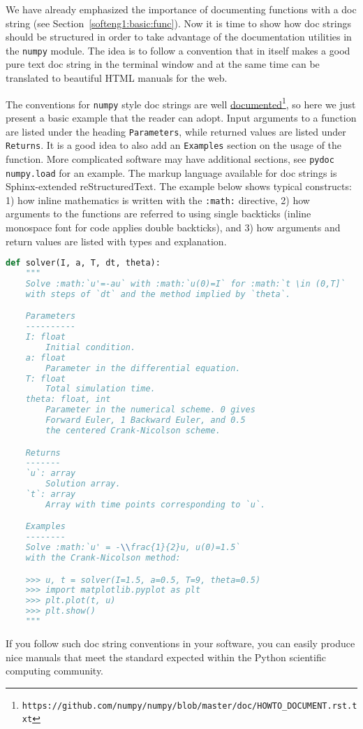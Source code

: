 \documentclass[graybox,sectrefs,envcountresetchap,open=right,final]{svmonodo}
\begin{document}
We have already emphasized the importance of documenting functions with
a doc string (see Section~\ref{softeng1:basic:func}). Now it is time
to show how doc strings should be structured in order to take advantage
of the documentation utilities in the \texttt{numpy} module. The idea is
to follow a convention that in itself makes a good pure text doc string
in the terminal window
and at the same time can be translated to beautiful HTML manuals for
the web.

The conventions for \texttt{numpy} style doc strings are well
\href{{https://github.com/numpy/numpy/blob/master/doc/HOWTO_DOCUMENT.rst.txt}}{documented}\footnote{\texttt{https://github.com/numpy/numpy/blob/master/doc/HOWTO\_DOCUMENT.rst.txt}}, so here we just present a basic example that the reader can adopt.
Input arguments to a function are listed under the heading \texttt{Parameters},
while returned values are listed under \texttt{Returns}. It is a good idea to
also add an \texttt{Examples} section on the usage of the function.
More complicated software may have additional sections, see \texttt{pydoc numpy.load}
for an example. The markup language available for doc strings is
Sphinx-extended reStructuredText. The example below shows typical
constructs: 1) how inline
mathematics is written with the \texttt{:math:} directive, 2) how arguments
to the functions are referred to using single backticks
(inline monospace font for code applies double backticks), and 3) how
arguments and return values are listed with types and explanation.

\begin{lstlisting}[language=Python,style=blue1_bluegreen]
def solver(I, a, T, dt, theta):
    """
    Solve :math:`u'=-au` with :math:`u(0)=I` for :math:`t \in (0,T]`
    with steps of `dt` and the method implied by `theta`.

    Parameters
    ----------
    I: float
        Initial condition.
    a: float
        Parameter in the differential equation.
    T: float
        Total simulation time.
    theta: float, int
        Parameter in the numerical scheme. 0 gives
        Forward Euler, 1 Backward Euler, and 0.5
        the centered Crank-Nicolson scheme.

    Returns
    -------
    `u`: array
        Solution array.
    `t`: array
        Array with time points corresponding to `u`.

    Examples
    --------
    Solve :math:`u' = -\\frac{1}{2}u, u(0)=1.5`
    with the Crank-Nicolson method:

    >>> u, t = solver(I=1.5, a=0.5, T=9, theta=0.5)
    >>> import matplotlib.pyplot as plt
    >>> plt.plot(t, u)
    >>> plt.show()
    """
\end{lstlisting}
If you follow such doc string conventions in your software, you can
easily produce nice manuals that meet the standard expected within
the Python scientific computing community.
\end{document}
